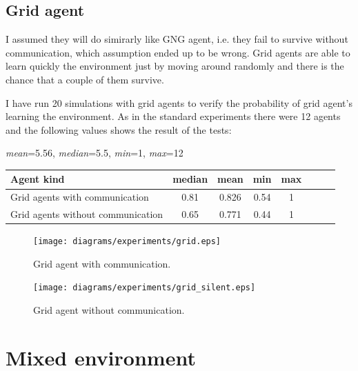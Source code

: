 \subsection{Grid agent}            

I assumed they will do simirarly like GNG agent, i.e. they fail to survive without communication, which assumption ended up to be wrong. Grid agents are able to learn quickly the environment just by moving around randomly and there is the chance that a couple of them survive.

I have run 20 simulations with grid agents to verify the probability of grid agent's learning the environment. As in the standard experiments there were 12 agents and the following values shows the result of the tests:


\begin{center}   
  \emph{mean}=5.56, \emph{median}=5.5, \emph{min}=1, \emph{max}=12                 
\end{center}

\begin{center}   
  \begin{tabular}{l*{6}{c}r}
  Agent kind        & median & mean & min & max \\
  \hline  
  Grid agents with communication        & 0.81 & 0.826 & 0.54 & 1 \\
  Grid agents without communication        & 0.65 & 0.771 & 0.44 & 1 \\
  \end{tabular}                  
\end{center}



\begin{figure}[h!]
  \centering                                
  \texttt{[image: diagrams/experiments/grid.eps]}    
  \caption{Grid agent with communication.}
  \label{experiments:gng}
\end{figure} 

\begin{figure}[h!]
  \centering                                
  \texttt{[image: diagrams/experiments/grid\_silent.eps]}    
  \caption{Grid agent without communication.}
  \label{experiments:gng-silent}
\end{figure} 

\section{Mixed environment}
                        
